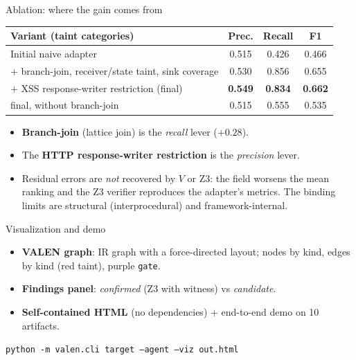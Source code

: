 \documentclass[aspectratio=169,11pt]{beamer}
\begin{document}
\begin{frame}{Ablation: where the gain comes from}
  \begin{center}
  \small
  \begin{tabular}{lccc}
  \toprule
  Variant (taint categories) & Prec. & Recall & F1 \\
  \midrule
  Initial naive adapter & 0.515 & 0.426 & 0.466 \\
  $+$ branch-join, receiver/state taint, sink coverage & 0.530 & 0.856 & 0.655 \\
  $+$ XSS response-writer restriction (final) & \textbf{0.549} & \textbf{0.834} & \textbf{0.662} \\
  \midrule
  final, without branch-join & 0.515 & 0.555 & 0.535 \\
  \bottomrule
  \end{tabular}
  \end{center}
  \begin{itemize}
    \item \textbf{Branch-join} (lattice join) is the \emph{recall} lever ($+0.28$).
    \item The \textbf{HTTP response-writer restriction} is the \emph{precision} lever.
    \item Residual errors are \emph{not} recovered by $V$ or Z3: the field worsens
          the mean ranking and the Z3 verifier reproduces the adapter's metrics.
          The binding limits are structural (interprocedural) and framework-internal.
  \end{itemize}
\end{frame}

\begin{frame}{Visualization and demo}
  \begin{itemize}
    \item \textbf{VALEN graph}: IR graph with a force-directed layout; nodes by kind,
          edges by kind (red taint), purple \texttt{gate}.
    \item \textbf{Findings panel}: \emph{confirmed} (Z3 with witness) vs \emph{candidate}.
    \item \textbf{Self-contained HTML} (no dependencies) $+$ end-to-end demo on 10 artifacts.
  \end{itemize}
  \vspace{2mm}
  \begin{center}
  \texttt{python -m valen.cli target --agent --viz out.html}
  \end{center}
\end{frame}
\end{document}
